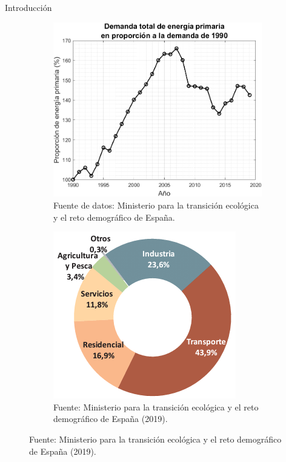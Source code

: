 \documentclass[spanish,a4paper]{beamer}%
\begin{document}
	\begin{frame}{Introducción}
		\vspace{10pt}	
		\begin{figure}
			\centering
			\begin{subfigure}[b]{0.58\textwidth}
			\centering
				\includegraphics[width=\textwidth]{DemandaEnergiaPrimariaProporcion1990.png}
				\caption*{Fuente de datos: Ministerio para la transición ecológica y el reto demográfico de España.}
			\end{subfigure} \hfill
			\begin{subfigure}[b]{0.4\textwidth}
				\centering
				\includegraphics[width=\textwidth]{consumoEnergiaFinalPorSectores_2019.png}
				\caption*{Fuente: Ministerio para la transición ecológica y el reto demográfico de España (2019).}
			\end{subfigure}
			\label{fig:demandaYconsumo}
		\end{figure}
	\end{frame}
\end{document}
